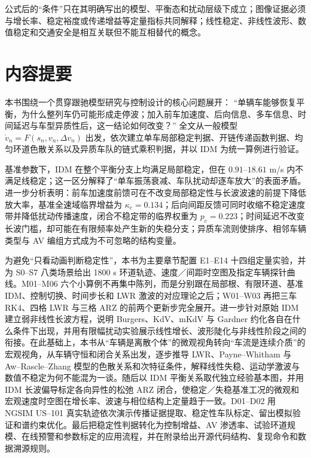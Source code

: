 \documentclass[11pt,a4paper,openany]{book}
\numberwithin{equation}{chapter}
\numberwithin{figure}{chapter}
\numberwithin{table}{chapter}
\begin{document}
\begin{tcolorbox}[chapterguide,title=\textbf{本书的阅读约定}]
公式后的“条件”只在其明确写出的模型、平衡态和扰动层级下成立；图像证据必须与增长率、稳定裕度或传递增益等定量指标共同解释；线性稳定、非线性波形、数值稳定和交通安全是相互关联但不能互相替代的概念。
\end{tcolorbox}
\clearpage

\chapter*{内容提要}
本书围绕一个贯穿跟驰模型研究与控制设计的核心问题展开：
“单辆车能够恢复平衡，为什么整列车仍可能形成走停波；加入前车加速度、后向信息、多车信息、时间延迟与车型异质性后，这一结论如何改变？”
全文从一般模型 $\dot v_n=F(s_n,v_n,\Delta v_n)$ 出发，依次建立单车局部稳定判据、开链传递函数判据、均匀环道色散关系以及异质车队的链式乘积判据，并以 IDM 为统一算例进行验证。

基准参数下，IDM 在整个平衡分支上均满足局部稳定，但在 $0.91$--$18.61$ m/s 内不满足线稳定；这一区分解释了“单车振荡衰减、车队扰动却逐车放大”的表面矛盾。进一步分析表明：前车加速度前馈可在不改变局部稳定性与长波波速的前提下降低放大率，基准全速域临界增益为 $\kappa_c=0.134$；后向间距反馈可同时收缩不稳定速度带并降低扰动传播速度，闭合不稳定带的临界权重为 $p_c=0.223$；时间延迟不改变长波门槛，却可能在有限频率处产生新的失稳分支；异质车流则使排序、相邻车辆类型与 AV 编组方式成为不可忽略的结构变量。

为避免“只看动画判断稳定性”，本书为主要章节配置 E1--E14 十四组定量实验，并为 S0--S7 八类场景给出 1800 s 环道轨迹、速度／间距时空图及指定车辆探针曲线。M01--M06 六个小算例不再集中陈列，而是分别跟在局部根、有限环道、基准 IDM、控制切换、时间步长和 LWR 激波的对应理论之后；W01--W03 再把三车 RK4、四格 LWR 与三格 ARZ 的前两个更新步完全展开。进一步针对原始 IDM 建立弱非线性长波方程，说明 Burgers、KdV、mKdV 与 Gardner 约化各自在什么条件下出现，并用有限幅扰动实验展示线性增长、波形陡化与非线性阶段之间的衔接。在此基础上，本书从“车辆是离散个体”的微观视角转向“车流是连续介质”的宏观视角，从车辆守恒和闭合关系出发，逐步推导 LWR、Payne--Whitham 与 Aw--Rascle--Zhang 模型的色散关系和次特征条件，解释线性失稳、运动学激波与数值不稳定为何不能混为一谈。随后以 IDM 平衡关系取代独立经验基本图，并用 IDM 长波偏导标定各向异性的松弛 ARZ 闭合，使稳定／失稳基准工况的微观和宏观速度时空图在增长率、波速与相位结构上定量趋于一致。D01--D02 用 NGSIM US--101 真实轨迹依次演示传播证据提取、稳定性车队标定、留出模拟验证和谱约束优化。最后把稳定性判据转化为控制增益、AV 渗透率、试验环道规模、在线预警和参数标定的应用流程，并在附录给出开源代码结构、复现命令和数据溯源规则。
\end{document}
